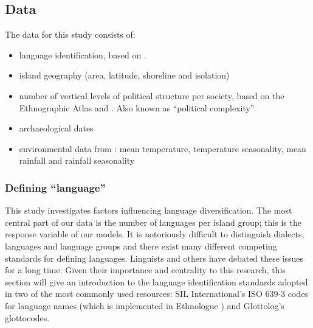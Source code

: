 \documentclass[a4paper,10pt]{article} %
\begin{document}
\subsection{Data}
The data for this study consists of:

\begin{itemize}
\item language identification, based on \citet{glottolog40}.
\item island geography (area, latitude, shoreline and isolation)
\item number of vertical levels of political structure per society, based on the Ethnographic Atlas \citep{gray1998ethnographic, d_place_all} and \citet{sheehan2018coevolution}. Also known as ``political complexity''
\item archaeological dates \citep{intoh2007reconnaissance, intoh2008ongoing, rieth_cochrane_2018, levin_seikel_miles_2019, pol_outliers_stat_art, Napolitano_et_al_yap}
\item environmental data from \citet{ecoclimate}: mean temperature, temperature seasonality, mean rainfall and rainfall seasonality
\end{itemize}



\subsubsection{Defining ``language''}
\label{sec:language_class}
This study investigates factors influencing language diversification. The most central part of our data is the number of languages per island group; this is the response variable of our models. It is notoriously difficult to distinguish dialects, languages and language groups and there exist many different competing standards for defining languages. Linguists and others have debated these issues for a long time. Given their importance and centrality to this research, this section will give an introduction to the language identification standards adopted in two of the most commonly used resources: SIL International's ISO 639-3 codes for language names (which is implemented in Ethnologue \citep{ethnologue22}) and Glottolog's glottocodes.
\end{document}
